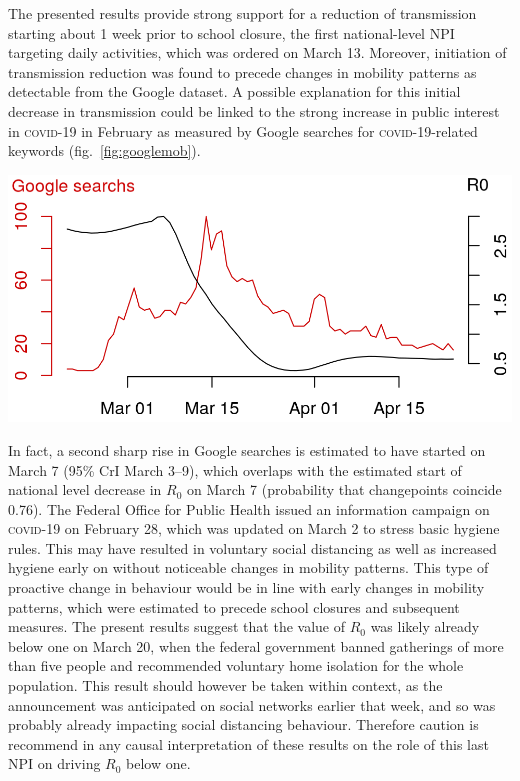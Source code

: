 The presented results provide strong support for a reduction of transmission starting about 1 week prior to school closure, the first national-level NPI targeting daily activities, which was ordered on March 13. Moreover, initiation of transmission reduction was found to precede changes in mobility patterns as detectable from the Google dataset. A possible explanation for this initial decrease in transmission could be linked to the strong increase in public interest in \textsc{covid}-19 in February as measured by Google searches for \textsc{covid}-19-related keywords (fig.~\ref{fig:googlemob}).
\begin{marginfigure}[1\baselineskip]
\includegraphics{fig_covid-switzerland-npi/fig_supp/google_trends.png}
\label{fig:googlemob}
\end{marginfigure}
 In fact, a second sharp rise in Google searches is estimated to have started on March 7 (95\% CrI March 3–9), which overlaps with the estimated start of national level decrease in $R_0$ on March 7 (probability that changepoints coincide 0.76). The Federal Office for Public Health issued an information campaign on \textsc{covid}-19 on February 28, which was updated on March 2 to stress basic hygiene rules\cite{OFSP:NouvellesReglesHygiene:2020}. This may have resulted in voluntary social distancing as well as increased hygiene early on without noticeable changes in mobility patterns. This type of proactive change in behaviour would be in line with early changes in mobility patterns, which were estimated to precede school closures and subsequent measures. The present results suggest that the value of $R_0$ was likely already below one on March 20, when the federal government banned gatherings of more than five people and recommended voluntary home isolation for the whole population. This result should however be taken within context, as the announcement was anticipated on social networks earlier that week, and so was probably already impacting social distancing behaviour. 
Therefore caution is recommend in any causal interpretation of these results on the role of this last NPI on driving $R_0$ below one.


